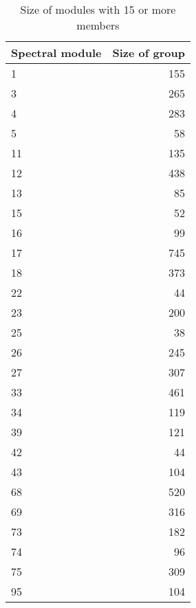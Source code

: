 \begin{table}[ht]
\centering
\begin{tabular}{lr}
  \hline
Spectral module & Size of group \\ 
  \hline
1 & 155 \\ 
  3 & 265 \\ 
  4 & 283 \\ 
  5 &  58 \\ 
  11 & 135 \\ 
  12 & 438 \\ 
  13 &  85 \\ 
  15 &  52 \\ 
  16 &  99 \\ 
  17 & 745 \\ 
  18 & 373 \\ 
  22 &  44 \\ 
  23 & 200 \\ 
  25 &  38 \\ 
  26 & 245 \\ 
  27 & 307 \\ 
  33 & 461 \\ 
  34 & 119 \\ 
  39 & 121 \\ 
  42 &  44 \\ 
  43 & 104 \\ 
  68 & 520 \\ 
  69 & 316 \\ 
  73 & 182 \\ 
  74 &  96 \\ 
  75 & 309 \\ 
  95 & 104 \\ 
   \hline
\end{tabular}
\caption{Size of modules with 15 or more members} 
\label{Table:foo_sizeof_modules with 15 or more members}
\end{table}


